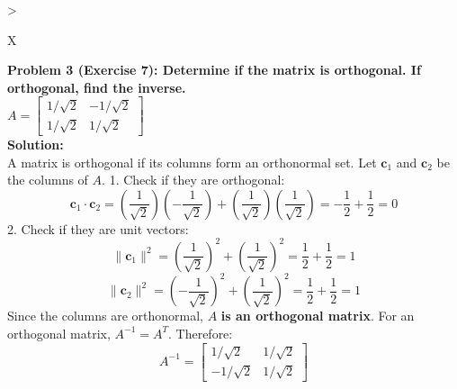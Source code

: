 \documentclass[11pt, letterpaper]{article}
\theoremstyle{definition}
\theoremstyle{remark}
\begin{document}
\begin{tabularx}{\textwidth}{>{\raggedright\arraybackslash}X}
\toprule
\textbf{Problem 3 (Exercise 7): Determine if the matrix is orthogonal. If orthogonal, find the inverse.} \\
$A = \begin{bmatrix} 1/\sqrt{2} & -1/\sqrt{2} \\ 1/\sqrt{2} & 1/\sqrt{2} \end{bmatrix}$ \\
\midrule
\textbf{Solution:} \\
A matrix is orthogonal if its columns form an orthonormal set. Let $\mathbf{c}_1$ and $\mathbf{c}_2$ be the columns of $A$.
1. Check if they are orthogonal:
\[ \mathbf{c}_1 \cdot \mathbf{c}_2 = \left(\frac{1}{\sqrt{2}}\right)\left(-\frac{1}{\sqrt{2}}\right) + \left(\frac{1}{\sqrt{2}}\right)\left(\frac{1}{\sqrt{2}}\right) = -\frac{1}{2} + \frac{1}{2} = 0 \]
2. Check if they are unit vectors:
\[ \|\mathbf{c}_1\|^2 = \left(\frac{1}{\sqrt{2}}\right)^2 + \left(\frac{1}{\sqrt{2}}\right)^2 = \frac{1}{2} + \frac{1}{2} = 1 \]
\[ \|\mathbf{c}_2\|^2 = \left(-\frac{1}{\sqrt{2}}\right)^2 + \left(\frac{1}{\sqrt{2}}\right)^2 = \frac{1}{2} + \frac{1}{2} = 1 \]
Since the columns are orthonormal, $A$ \textbf{is an orthogonal matrix}. 
For an orthogonal matrix, $A^{-1} = A^T$. Therefore:
\[ A^{-1} = \begin{bmatrix} 1/\sqrt{2} & 1/\sqrt{2} \\ -1/\sqrt{2} & 1/\sqrt{2} \end{bmatrix} \] \\
\bottomrule
\end{tabularx}
\vspace{1em}
\end{document}
